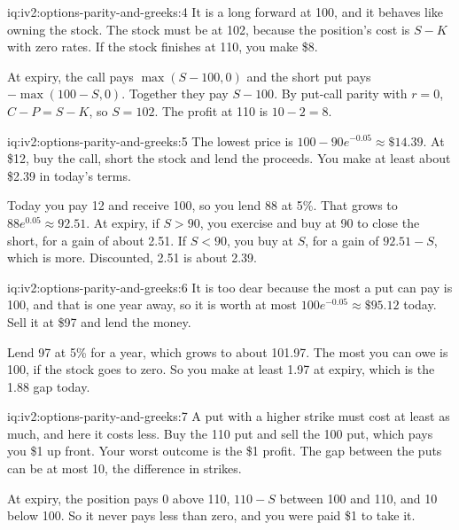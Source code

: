 \begin{solution}{iq:iv2:options-parity-and-greeks:4}
It is a long forward at 100, and it behaves like owning the stock. The stock must be at 102, because the position's cost is $S - K$ with zero rates. If the stock finishes at 110, you make \$8.

At expiry, the call pays $\max(S - 100, 0)$ and the short put pays $-\max(100 - S, 0)$. Together they pay $S - 100$. By put-call parity with $r = 0$, $C - P = S - K$, so $S = 102$. The profit at 110 is $10 - 2 = 8$.

\end{solution}

\begin{solution}{iq:iv2:options-parity-and-greeks:5}
The lowest price is $100 - 90e^{-0.05} \approx \$14.39$. At \$12, buy the call, short the stock and lend the proceeds. You make at least about \$2.39 in today's terms.

Today you pay 12 and receive 100, so you lend 88 at 5\%. That grows to $88e^{0.05} \approx 92.51$. At expiry, if $S > 90$, you exercise and buy at 90 to close the short, for a gain of about 2.51. If $S < 90$, you buy at $S$, for a gain of $92.51 - S$, which is more. Discounted, 2.51 is about 2.39.

\end{solution}

\begin{solution}{iq:iv2:options-parity-and-greeks:6}
It is too dear because the most a put can pay is 100, and that is one year away, so it is worth at most $100e^{-0.05} \approx \$95.12$ today. Sell it at \$97 and lend the money.

Lend 97 at 5\% for a year, which grows to about 101.97. The most you can owe is 100, if the stock goes to zero. So you make at least 1.97 at expiry, which is the 1.88 gap today.

\end{solution}

\begin{solution}{iq:iv2:options-parity-and-greeks:7}
A put with a higher strike must cost at least as much, and here it costs less. Buy the 110 put and sell the 100 put, which pays you \$1 up front. Your worst outcome is the \$1 profit. The gap between the puts can be at most 10, the difference in strikes.

At expiry, the position pays 0 above 110, $110 - S$ between 100 and 110, and 10 below 100. So it never pays less than zero, and you were paid \$1 to take it.

\end{solution}

